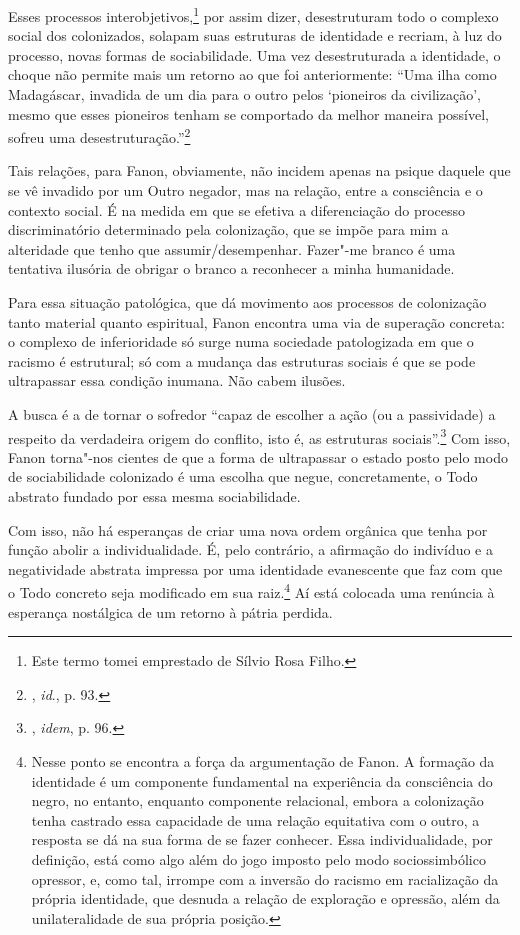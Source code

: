 Esses processos interobjetivos,\footnote{Este termo tomei emprestado de
  Sílvio Rosa Filho.} por assim dizer, desestruturam todo o complexo
social dos colonizados, solapam suas estruturas de identidade e recriam,
à luz do processo, novas formas de sociabilidade. Uma vez desestruturada
a identidade, o choque não permite mais um retorno ao que foi
anteriormente: ``Uma ilha como Madagáscar, invadida de um dia para o
outro pelos `pioneiros da civilização', mesmo que esses pioneiros tenham
se comportado da melhor maneira possível, sofreu uma
desestruturação.''\footnote{, \emph{id}., p. 93.}

Tais relações, para Fanon, obviamente, não incidem apenas na psique
daquele que se vê invadido por um Outro negador, mas na relação, entre a
consciência e o contexto social. É na medida em que se efetiva a
diferenciação do processo discriminatório determinado pela colonização,
que se impõe para mim a alteridade que tenho que assumir/desempenhar.
Fazer"-me branco é uma tentativa ilusória de obrigar o branco a
reconhecer a minha humanidade.

Para essa situação patológica, que dá movimento aos processos de
colonização tanto material quanto espiritual, Fanon encontra uma via de
superação concreta: o complexo de inferioridade só surge numa sociedade
patologizada em que o racismo é estrutural; só com a mudança das
estruturas sociais é que se pode ultrapassar essa condição inumana. Não
cabem ilusões.

A busca é a de tornar o sofredor ``capaz de escolher a ação (ou a
passividade) a respeito da verdadeira origem do conflito, isto é, as
estruturas sociais''.\footnote{, \emph{idem}, p. 96.} Com isso, Fanon
torna"-nos cientes de que a forma de ultrapassar o estado posto pelo modo
de sociabilidade colonizado é uma escolha que negue, concretamente, o
Todo abstrato fundado por essa mesma sociabilidade.

Com isso, não há esperanças de criar uma nova ordem orgânica que tenha
por função abolir a individualidade. É, pelo contrário, a afirmação do
indivíduo e a negatividade abstrata impressa por uma identidade
evanescente que faz com que o Todo concreto seja modificado em sua
raiz.\footnote{Nesse ponto se encontra a força da argumentação de Fanon.
  A formação da identidade é um componente fundamental na experiência da
  consciência do negro, no entanto, enquanto componente relacional,
  embora a colonização tenha castrado essa capacidade de uma relação
  equitativa com o outro, a resposta se dá na sua forma de se fazer
  conhecer. Essa individualidade, por definição, está como algo além do
  jogo imposto pelo modo sociossimbólico opressor, e, como tal, irrompe
  com a inversão do racismo em racialização da própria identidade, que
  desnuda a relação de exploração e opressão, além da unilateralidade de
  sua própria posição.} Aí está colocada uma renúncia à esperança
nostálgica de um retorno à pátria perdida.


